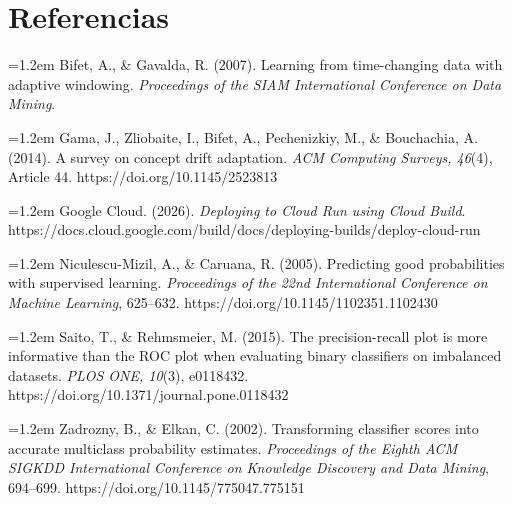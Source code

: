\documentclass[11pt,letterpaper]{article}
\newcommand{\aparef}[1]{\par\hangindent=1.2em\hangafter=1 #1\par}
\begin{document}
\section*{Referencias}
\small
\aparef{Bifet, A., \& Gavalda, R. (2007). Learning from time-changing data with adaptive windowing. \emph{Proceedings of the SIAM International Conference on Data Mining}.}
\aparef{Gama, J., Zliobaite, I., Bifet, A., Pechenizkiy, M., \& Bouchachia, A. (2014). A survey on concept drift adaptation. \emph{ACM Computing Surveys, 46}(4), Article 44. https://doi.org/10.1145/2523813}
\aparef{Google Cloud. (2026). \emph{Deploying to Cloud Run using Cloud Build}. https://docs.cloud.google.com/build/docs/deploying-builds/deploy-cloud-run}
\aparef{Niculescu-Mizil, A., \& Caruana, R. (2005). Predicting good probabilities with supervised learning. \emph{Proceedings of the 22nd International Conference on Machine Learning}, 625--632. https://doi.org/10.1145/1102351.1102430}
\aparef{Saito, T., \& Rehmsmeier, M. (2015). The precision-recall plot is more informative than the ROC plot when evaluating binary classifiers on imbalanced datasets. \emph{PLOS ONE, 10}(3), e0118432. https://doi.org/10.1371/journal.pone.0118432}
\aparef{Zadrozny, B., \& Elkan, C. (2002). Transforming classifier scores into accurate multiclass probability estimates. \emph{Proceedings of the Eighth ACM SIGKDD International Conference on Knowledge Discovery and Data Mining}, 694--699. https://doi.org/10.1145/775047.775151}
\end{document}
